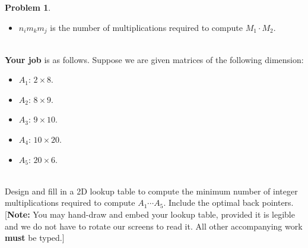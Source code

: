 \documentclass[11pt]{article}
\theoremstyle{definition}
\theoremstyle{definition}
\newtheorem{required}{Problem}
\theoremstyle{definition}
\begin{document}
\begin{required}
\begin{itemize}
\item $n_{i}m_{k}m_{j}$ is the number of multiplications required to compute $M_{1} \cdot M_{2}$. 
\end{itemize}


\noindent \\ \textbf{Your job} is as follows. Suppose we are given matrices of the following dimension:
\begin{itemize}
\item $A_{1}$: $2 \times 8$.
\item $A_{2}$: $8 \times 9$.
\item $A_{3}$: $9 \times 10$.
\item $A_{4}$: $10 \times 20$.
\item $A_{5}$: $20 \times 6$.
\end{itemize}

\noindent \\ Design and fill in a 2D lookup table to compute the minimum number of integer multiplications required to compute $A_{1} \cdots A_{5}$. Include the optimal back pointers. [\textbf{Note:} You may hand-draw and embed your lookup table, provided it is legible and we do not have to rotate our screens to read it. All other accompanying work \textbf{must} be typed.]
\end{required}
\end{document}
